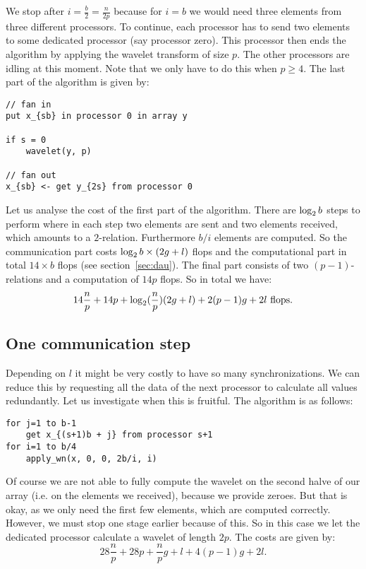 We stop after $i=\frac{b}{2}=\frac{n}{2p}$ because for $i=b$ we would need three elements from three different processors. To continue, each processor has to send two elements to some dedicated processor (say processor zero). This processor then ends the algorithm by applying the wavelet transform of size $p$. The other processors are idling at this moment. Note that we only have to do this when $p \geq 4$. The last part of the algorithm is given by:

\begin{lstlisting}
// fan in
put x_{sb} in processor 0 in array y

if s = 0
	wavelet(y, p)

// fan out
x_{sb} <- get y_{2s} from processor 0
\end{lstlisting}

Let us analyse the cost of the first part of the algorithm. There are $\operatorname{\log_2}{b}$ steps to perform where in each step two elements are sent and two elements received, which amounts to a $2$-relation. Furthermore $b/i$ elements are computed. So the communication part costs $\operatorname{\log_2}{b}\times(2g+l)$ flops and the computational part in total $14 \times b$ flops (see section~\ref{sec:dau}). The final part consists of two $(p-1)$-relations and a computation of $14p$ flops. So in total we have:
\[ 14\frac{n}{p} + 14p + \operatorname{\log_2}(\frac{n}{p})(2g + l) + 2(p-1)g + 2l \text{ flops}.\]


\subsection{One communication step}
Depending on $l$ it might be very costly to have so many synchronizations. We can reduce this by requesting all the data of the next processor to calculate all values redundantly. Let us investigate when this is fruitful. The algorithm is as follows:

\begin{lstlisting}
for j=1 to b-1
	get x_{(s+1)b + j} from processor s+1
for i=1 to b/4
	apply_wn(x, 0, 0, 2b/i, i)
\end{lstlisting}

Of course we are not able to fully compute the wavelet on the second halve of our array (i.e. on the elements we received), because we provide zeroes. But that is okay, as we only need the first few elements, which are computed correctly. However, we must stop one stage earlier because of this. So in this case we let the dedicated processor calculate a wavelet of length $2p$. The costs are given by:
\[ 28\frac{n}{p} + 28p + \frac{n}{p}g + l + 4(p-1)g + 2l. \]


